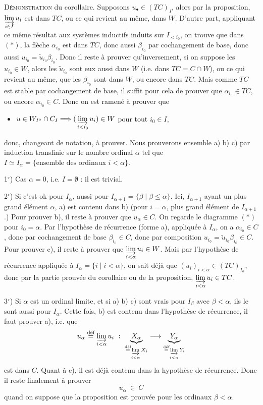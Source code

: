 
\textsc{Démonstration} du corollaire. Supposons $u_\bullet \in (TC)_I$, alors par la proposition, $\varinjlim\limits_{i\in I} u_i$ est dans $TC$, ou ce qui revient au même, dans $W$. D'autre part, appliquant ce même résultat aux systèmes inductifs induits sur $I_{<i_0}$, on trouve que dans $(*)$, la flèche $\alpha_{i_0}$ est dans $TC$, donc aussi $\beta_{i_0}$ par cochangement de base, donc aussi $u_{i_0} = \tilde{u}_{i_0}\beta_{i_0}$. Donc il reste à prouver qu'inversement, si on suppose les $u_{i_0} \in W$, alors les $\tilde{u}_{i_0}$ sont eux aussi dans $W$ (i.e. dans $TC = C \cap W$), ou ce qui revient au même, que les $\beta_{i_0}$ sont dans $W$, ou encore dans $TC$. Mais comme $TC$ est stable par cochangement de base, il suffit pour cela de prouver que $\alpha_{i_0} \in TC$, ou encore $\alpha_{i_0} \in C$. Donc on est ramené à prouver que
\begin{itemize}[leftmargin=2.5em]
\item[c)] $u \in W_{I^{\circ}} \cap C_I \Longrightarrow (\,\varinjlim\limits_{i<i_0} u_i) \in W$ pour tout $i_0 \in I$,
\end{itemize}
donc, changeant de notation, à prouver. Nous prouverons ensemble a) b) c) par induction transfinie sur le nombre ordinal $\alpha$ tel que $I \simeq I_\alpha = \{\text{ensemble des ordinaux } i < \alpha\}$.


1$^\circ$) Cas $\alpha = 0$, i.e. $I = \emptyset$ : il est trivial.

2$^\circ$) Si c'est ok pour $I_\alpha$, aussi pour $I_{\alpha+1} = \{\beta \mid \beta \leq \alpha\}$. Ici, $I_{\alpha+1}$ ayant un plus grand élément $\alpha$, a) est contenu dans b) (pour $i = \alpha$, plus grand élément de $I_{\alpha+1}$.) Pour prouver b), il reste à prouver que $u_\alpha \in C$. On regarde le diagramme $(*)$ pour $i_0 = \alpha$. Par l'hypothèse de récurrence (forme a), appliquée à $I_\alpha$, on a $\alpha_{i_0} \in C$, donc par cochangement de base $\beta_{i_0} \in C$, donc par composition $u_{i_0} = \tilde{u}_{i_0}\beta_{i_0} \in C$. Pour prouver c), il reste à prouver que $\varinjlim\limits_{i<\alpha} u_i \in W$. Mais par l'hypothèse de récurrence appliquée à $I_\alpha = \{i \mid i < \alpha\}$, on sait déjà que $(u_i)_{i<\alpha} \in (TC)_{I_\alpha}$, donc par la partie prouvée du corollaire ou de la proposition, $\varinjlim\limits_{i<\alpha} u_i \in TC$.

3$^\circ$) Si $\alpha$ est un ordinal limite, et si a) b) c) sont vrais pour $I_\beta$ avec $\beta < \alpha$, ils le sont aussi pour $I_\alpha$. Cette fois, b) est contenu dans l'hypothèse de
récurrence, il faut prouver a), i.e. que
\[
u_\alpha \overset{\text{déf}}{=} \varinjlim_{i<\alpha} u_i \ :\ \underbrace{X_\alpha}_{\overset{\text{déf}}{=} \varinjlim\limits_{i<\alpha} X_i} \longrightarrow \underbrace{Y_\alpha}_{\overset{\text{déf}}{=} \varinjlim\limits_{i<\alpha} Y_i}
\]
est dans $C$. Quant à c), il est déjà contenu dans la hypothèse de récurrence. Donc il reste finalement à prouver
\[
u_\alpha \ \in \ C
\]
quand on suppose que la proposition est prouvée pour les ordinaux $\beta < \alpha$.

